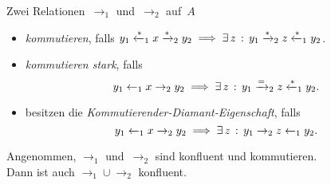 \documentclass{cheat-sheet}
\newcommand{\from}{\leftarrow}
\newcommand{\reducesTo}{\xrightarrow{*}}
\newcommand{\reducesFrom}{\xleftarrow{*}}
\newcommand{\toOrEq}{\xrightarrow{=}}
\begin{document}
\begin{defn}
  Zwei Relationen~${\to_1}$ und~${\to_2}$ auf~$A$
  \begin{itemize}
    \item \emph{kommutieren}, falls $y_1 \reducesFrom_1 x \reducesTo_2 y_2 \implies \ex{z} y_1 \reducesTo_2 z \reducesFrom_1 y_2$.
    \item \emph{kommutieren stark}, falls
    \[
      y_1 \from_1 x \to_2 y_2 \implies \ex{z} y_1 \toOrEq_2 z \reducesFrom_1 y_2.
    \]
    \item besitzen die \emph{Kommutierender-Diamant-Eigenschaft}, falls
    \[
      y_1 \from_1 x \to_2 y_2 \implies \ex{z} y_1 \to_2 z \from_1 y_2.
    \]
  \end{itemize}
\end{defn}

\begin{lem}
  Angenommen, $\to_1$ und~$\to_2$ sind konfluent und kommutieren. \\
  Dann ist auch ${\to_1} \cup {\to_2}$ konfluent.
\end{lem}
\end{document}

